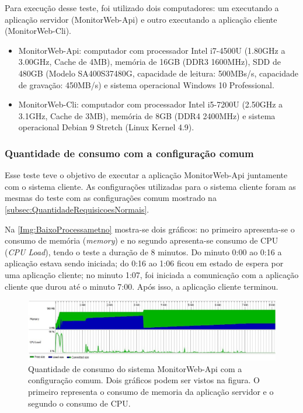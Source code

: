 Para execução desse teste, foi utilizado dois computadores: um executando a aplicação servidor (MonitorWeb-Api) e outro executando a aplicação cliente (MonitorWeb-Cli).

\begin{itemize}
    \item MonitorWeb-Api: computador com processador Intel i7-4500U (1.80GHz a 3.00GHz, Cache de 4MB), memória de 16GB (DDR3 1600MHz), SDD de 480GB (Modelo SA400S37480G, capacidade de leitura: 500MBs/s, capacidade de gravação: 450MB/s) e sistema operacional Windows 10 Professional.
    
    \item MonitorWeb-Cli: computador com processador Intel i5-7200U (2.50GHz a 3.1GHz, Cache de 3MB), memória de 8GB (DDR4 2400MHz) e sistema operacional Debian 9 Stretch (Linux Kernel 4.9).
\end{itemize}

\subsubsection{Quantidade de consumo com a configuração comum} \label{subsec:APIQuantidadeRequisicoesNormais}

Esse teste teve o objetivo de executar a aplicação MonitorWeb-Api juntamente com o sistema cliente. As configurações utilizadas para o sistema cliente foram as mesmas do teste com as configurações comum mostrado na \autoref{subsec:QuantidadeRequisicoesNormais}.

Na \autoref{Img:BaixoProcessametno} mostra-se dois gráficos: no primeiro apresenta-se o consumo de memória (\textit{memory}) e no segundo apresenta-se consumo de CPU (\textit{CPU Load}), tendo o teste a duração de 8 minutos. Do minuto 0:00 ao 0:16 a aplicação estava sendo iniciada; do 0:16 ao 1:06 ficou em estado de espera por uma aplicação cliente; no minuto 1:07, foi iniciada a comunicação com a aplicação cliente que durou até o minuto 7:00. Após isso, a aplicação cliente terminou.

\begin{figure}[H]
	\centering
	\includegraphics[width=1.0\textwidth]{figuras/MonitorWebApiTeste4/BaixoProcessametno.jpg}
	\caption[Quantidade de consumo com a configuração comum]{Quantidade de consumo do sistema MonitorWeb-Api com a configuração comum. Dois gráficos podem ser vistos na figura. O primeiro representa o consumo de memoria da aplicação servidor e o segundo o consumo de CPU.}
	\label{Img:BaixoProcessametno}
\end{figure}



